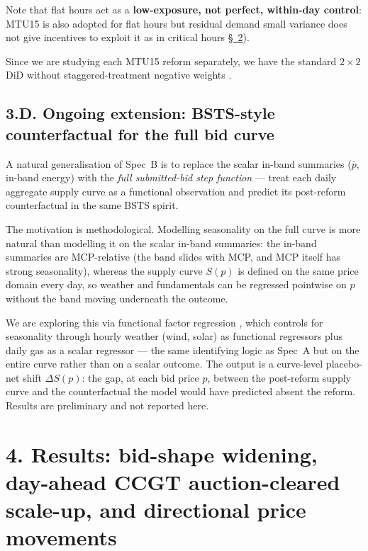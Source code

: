 \documentclass[11pt]{article}
\begin{document}
Note that flat hours act as a \textbf{low-exposure, not perfect, within-day control}: MTU15 is also adopted for flat hours but residual demand small variance does not give incentives to exploit it as in critical hours \hyperref[sec:partition]{\S~2}).

Since we are studying each MTU15 reform separately, we have the standard $2\times 2$ DiD without staggered-treatment negative weights \citep[ch.~3]{de_chaisemartin_2026}.

\subsection*{3.D. Ongoing extension: BSTS-style counterfactual for the full bid curve}\label{sec:fbr}
A natural generalisation of Spec~B is to replace the scalar in-band summaries ($\bar p$, in-band energy) with the \emph{full submitted-bid step function} --- treat each daily aggregate supply curve as a functional observation and predict its post-reform counterfactual in the same BSTS spirit.

The motivation is methodological. Modelling seasonality on the full curve is more natural than modelling it on the scalar in-band summaries: the in-band summaries are MCP-relative (the band slides with MCP, and MCP itself has strong seasonality), whereas the supply curve $S(p)$ is defined on the same price domain every day, so weather and fundamentals can be regressed pointwise on $p$ without the band moving underneath the outcome.

We are exploring this via functional factor regression \citep{otto_winter_2025}, which controls for seasonality through hourly weather (wind, solar) as functional regressors plus daily gas as a scalar regressor --- the same identifying logic as Spec~A but on the entire curve rather than on a scalar outcome. The output is a curve-level placebo-net shift $\Delta S(p)$: the gap, at each bid price $p$, between the post-reform supply curve and the counterfactual the model would have predicted absent the reform. Results are preliminary and not reported here.

\vspace{10pt}

\section*{4. Results: bid-shape widening, day-ahead CCGT auction-cleared scale-up, and directional price movements}
\label{sec:results}
\end{document}
